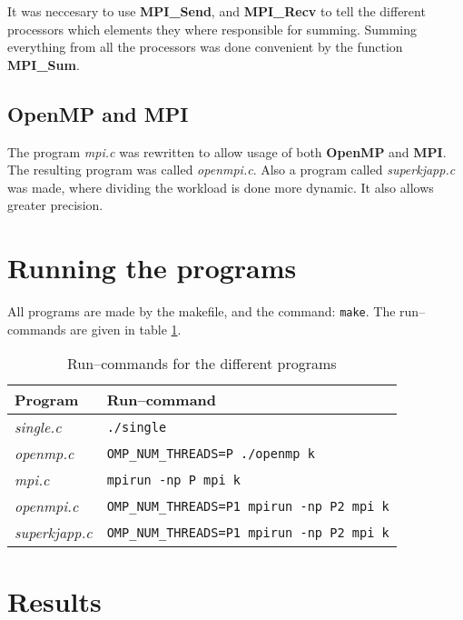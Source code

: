 It was neccesary to use \textbf{MPI\_Send}, and \textbf{MPI\_Recv} to tell the different processors which elements they where responsible for summing. Summing everything from all the processors was done convenient by the function \textbf{MPI\_Sum}.




\subsection{OpenMP and MPI}

The program \textit{mpi.c} was rewritten to allow usage of both \textbf{OpenMP} and \textbf{MPI}.  The resulting program was called \textit{openmpi.c}. Also a program called \textit{superkjapp.c} was made, where dividing the workload is done more dynamic. It also allows greater precision.



\section{Running the programs}
All programs are made by the makefile, and the command: \texttt{make}. The run--commands are given in table \ref{runcommand}.
\begin{table}[h!]
\begin{tabular}{ll}
Program & Run--command\\
\hline
\textit{single.c}& \texttt{./single} \\
\textit{openmp.c}& \texttt{OMP\_NUM\_THREADS=P ./openmp k}\\
\textit{mpi.c}	& \texttt{mpirun -np P mpi k} \\
\textit{openmpi.c} & \texttt{OMP\_NUM\_THREADS=P1 mpirun -np P2 mpi k} \\
\textit{superkjapp.c} & \texttt{OMP\_NUM\_THREADS=P1 mpirun -np P2 mpi k} \\
\end{tabular}
\caption{Run--commands for the different programs}\label{runcommand}
\end{table}

\section{Results}

